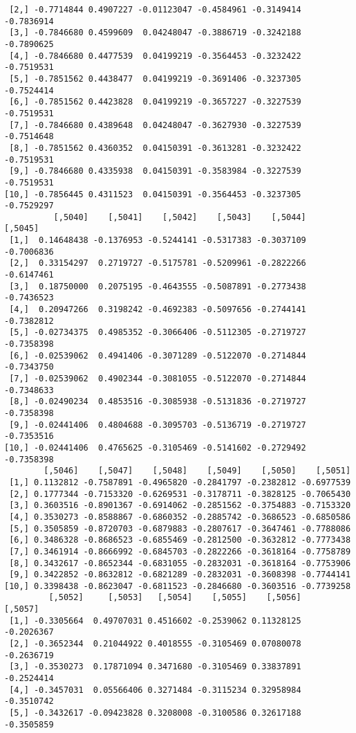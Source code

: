\documentclass[
  letterpaper,
  DIV=11,
  numbers=noendperiod]{scrreprt}
\begin{document}
\begin{verbatim}
 [2,] -0.7714844 0.4907227 -0.01123047 -0.4584961 -0.3149414 -0.7836914
 [3,] -0.7846680 0.4599609  0.04248047 -0.3886719 -0.3242188 -0.7890625
 [4,] -0.7846680 0.4477539  0.04199219 -0.3564453 -0.3232422 -0.7519531
 [5,] -0.7851562 0.4438477  0.04199219 -0.3691406 -0.3237305 -0.7524414
 [6,] -0.7851562 0.4423828  0.04199219 -0.3657227 -0.3227539 -0.7519531
 [7,] -0.7846680 0.4389648  0.04248047 -0.3627930 -0.3227539 -0.7514648
 [8,] -0.7851562 0.4360352  0.04150391 -0.3613281 -0.3232422 -0.7519531
 [9,] -0.7846680 0.4335938  0.04150391 -0.3583984 -0.3227539 -0.7519531
[10,] -0.7856445 0.4311523  0.04150391 -0.3564453 -0.3237305 -0.7529297
          [,5040]    [,5041]    [,5042]    [,5043]    [,5044]    [,5045]
 [1,]  0.14648438 -0.1376953 -0.5244141 -0.5317383 -0.3037109 -0.7006836
 [2,]  0.33154297  0.2719727 -0.5175781 -0.5209961 -0.2822266 -0.6147461
 [3,]  0.18750000  0.2075195 -0.4643555 -0.5087891 -0.2773438 -0.7436523
 [4,]  0.20947266  0.3198242 -0.4692383 -0.5097656 -0.2744141 -0.7382812
 [5,] -0.02734375  0.4985352 -0.3066406 -0.5112305 -0.2719727 -0.7358398
 [6,] -0.02539062  0.4941406 -0.3071289 -0.5122070 -0.2714844 -0.7343750
 [7,] -0.02539062  0.4902344 -0.3081055 -0.5122070 -0.2714844 -0.7348633
 [8,] -0.02490234  0.4853516 -0.3085938 -0.5131836 -0.2719727 -0.7358398
 [9,] -0.02441406  0.4804688 -0.3095703 -0.5136719 -0.2719727 -0.7353516
[10,] -0.02441406  0.4765625 -0.3105469 -0.5141602 -0.2729492 -0.7358398
        [,5046]    [,5047]    [,5048]    [,5049]    [,5050]    [,5051]
 [1,] 0.1132812 -0.7587891 -0.4965820 -0.2841797 -0.2382812 -0.6977539
 [2,] 0.1777344 -0.7153320 -0.6269531 -0.3178711 -0.3828125 -0.7065430
 [3,] 0.3603516 -0.8901367 -0.6914062 -0.2851562 -0.3754883 -0.7153320
 [4,] 0.3530273 -0.8588867 -0.6860352 -0.2885742 -0.3686523 -0.6850586
 [5,] 0.3505859 -0.8720703 -0.6879883 -0.2807617 -0.3647461 -0.7788086
 [6,] 0.3486328 -0.8686523 -0.6855469 -0.2812500 -0.3632812 -0.7773438
 [7,] 0.3461914 -0.8666992 -0.6845703 -0.2822266 -0.3618164 -0.7758789
 [8,] 0.3432617 -0.8652344 -0.6831055 -0.2832031 -0.3618164 -0.7753906
 [9,] 0.3422852 -0.8632812 -0.6821289 -0.2832031 -0.3608398 -0.7744141
[10,] 0.3398438 -0.8623047 -0.6811523 -0.2846680 -0.3603516 -0.7739258
         [,5052]     [,5053]   [,5054]    [,5055]    [,5056]    [,5057]
 [1,] -0.3305664  0.49707031 0.4516602 -0.2539062 0.11328125 -0.2026367
 [2,] -0.3652344  0.21044922 0.4018555 -0.3105469 0.07080078 -0.2636719
 [3,] -0.3530273  0.17871094 0.3471680 -0.3105469 0.33837891 -0.2524414
 [4,] -0.3457031  0.05566406 0.3271484 -0.3115234 0.32958984 -0.3510742
 [5,] -0.3432617 -0.09423828 0.3208008 -0.3100586 0.32617188 -0.3505859

\end{verbatim}
\end{document}
